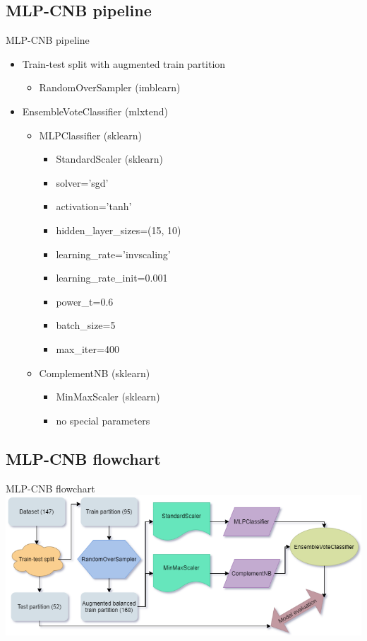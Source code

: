\documentclass[hyperref={bookmarks=false}]{beamer}
\begin{document}
\subsection{MLP-CNB pipeline}
\begin{frame}{MLP-CNB pipeline}
\begin{itemize}
    \item Train-test split with augmented train partition
    \begin{itemize}
        \item RandomOverSampler (imblearn)
    \end{itemize}
    
    \item EnsembleVoteClassifier (mlxtend)
    \begin{itemize}
        \item MLPClassifier (sklearn)
        \begin{itemize}
            \item StandardScaler (sklearn)
            \item solver='sgd'
            \item activation='tanh'
            \item hidden\_layer\_sizes=(15, 10)
            \item learning\_rate='invscaling'
            \item learning\_rate\_init=0.001
            \item power\_t=0.6
            \item batch\_size=5
            \item max\_iter=400
        \end{itemize}
        
        \item ComplementNB (sklearn)
        \begin{itemize}
            \item MinMaxScaler (sklearn)
            \item no special parameters
        \end{itemize}
    \end{itemize}
\end{itemize}
\end{frame}

\subsection{MLP-CNB flowchart}
\begin{frame}{MLP-CNB flowchart}
\includegraphics[width=\textwidth]{flowchart.png}
\end{frame}
\end{document}
